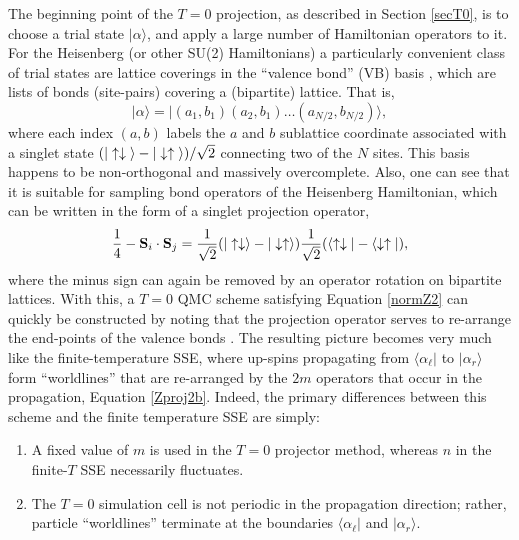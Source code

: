 \documentclass[vecphys]{svmult}
\begin{document}
The beginning point of the $T=0$ projection, as described in Section \ref{secT0}, is to choose a trial state $| \alpha \rangle$, and apply a large number of Hamiltonian operators to it.  
For the Heisenberg (or other SU(2) Hamiltonians) a particularly convenient class of trial states are lattice coverings in the ``valence bond'' (VB) basis \cite{Melko:Liang88,Melko:Sandvik05,Melko:Beach06,Melko:AWSBeach}, which are lists of bonds (site-pairs) covering a (bipartite) lattice.  That is, 
\begin{equation}
| \alpha \rangle = | (a_1,b_1)(a_2,b_1) \ldots (a_{N/2}, b_{N/2})  \rangle,
\end{equation}
where each index $(a,b)$ labels the $a$ and $b$ sublattice coordinate associated with a singlet state $(|\uparrow \downarrow \hspace{1mm} \rangle  - | \downarrow \uparrow \hspace{1mm} \rangle)/\sqrt{2}$ connecting two of the $N$ sites.  This basis happens to be non-orthogonal and massively overcomplete.  Also, one can see that it is suitable for sampling bond operators of the Heisenberg Hamiltonian, which can be written in the form of a singlet projection operator,
\begin{equation}
\frac{1}{4} - {\bf  S}_i \cdot {\bf S}_j = \frac{1}{\sqrt{2}} (|\uparrow \downarrow \rangle  - |\downarrow \uparrow \rangle)
 \frac{1}{\sqrt{2}}  (\langle \uparrow \downarrow |  - \langle \downarrow \uparrow |),
\end{equation}
where the minus sign can again be removed by an operator rotation on bipartite lattices.
With this, a $T=0$ QMC scheme satisfying Equation \ref{normZ2} can quickly be constructed by noting that the projection operator serves to re-arrange the end-points of the valence bonds \cite{Melko:Sandvik05}.  The resulting picture becomes very much like the finite-temperature SSE, where up-spins propagating from $\langle \alpha_{\ell} |$ to $| \alpha_r \rangle$ form ``worldlines'' that are re-arranged by the $2m$ operators that occur in the propagation, Equation \ref{Zproj2b}.
Indeed, the primary differences between this scheme and the finite temperature SSE are simply:
\begin{enumerate}
\item A fixed value of $m$ is used in the $T=0$ projector method, whereas $n$ in the finite-$T$ SSE necessarily fluctuates.
\item The $T=0$ simulation cell is not periodic in the propagation direction; rather, particle ``worldlines'' terminate at the boundaries  $\langle \alpha_{\ell} |$ and $| \alpha_r \rangle$.
\end{enumerate}
\end{document}
